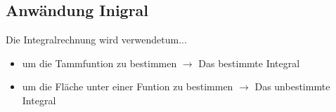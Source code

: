 \subsection{Anwändung Inigral}

Die Integralrechnung wird verwendetum...\\
\begin{itemize}
    \item um die Tammfuntion zu bestimmen $\rightarrow$ Das bestimmte Integral
    \item um die Fläche unter einer Funtion zu bestimmen $\rightarrow$ Das unbestimmte Integral
\end{itemize}